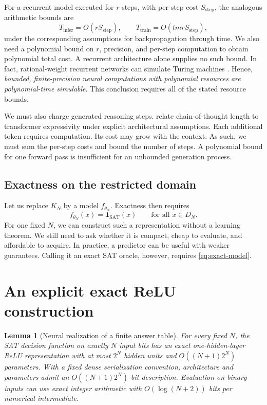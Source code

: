 \documentclass[11pt,a4paper]{article}
\numberwithin{equation}{section}
\newcommand{\SAT}{\mathrm{SAT}}
\newcommand{\ind}{\mathbf{1}}
\theoremstyle{plain}
\newtheorem{lemma}{Lemma}[section]
\theoremstyle{definition}
\theoremstyle{remark}
\begin{document}
For a recurrent model executed for $r$ steps, with per-step cost $S_{\mathrm{step}}$, the analogous arithmetic bounds are
\begin{equation}
T_{\mathrm{infer}}=O(rS_{\mathrm{step}}),\qquad
T_{\mathrm{train}}=O(tmrS_{\mathrm{step}}),
\end{equation}
under the corresponding assumptions for backpropagation through time. We also need a polynomial bound on $r$, precision, and per-step computation to obtain polynomial total cost. A recurrent architecture alone supplies no such bound. In fact, rational-weight recurrent networks can simulate Turing machines \citep{siegelmann1995}. Hence, \emph{bounded, finite-precision neural computations with polynomial resources are polynomial-time simulable}. This conclusion requires all of the stated resource bounds.

We must also charge generated reasoning steps. \citet{merrill2024cot} relate chain-of-thought length to transformer expressivity under explicit architectural assumptions. Each additional token requires computation. Its cost may grow with the context. As such, we must sum the per-step costs and bound the number of steps. A polynomial bound for one forward pass is insufficient for an unbounded generation process.

\subsection{Exactness on the restricted domain}

Let us replace $K_N$ by a model $f_{\theta_N}$. Exactness then requires
\begin{equation}
f_{\theta_N}(x)=\ind_{\SAT}(x)
\qquad\text{for all }x\in D_N.
\label{eq:exact-model}
\end{equation}
For one fixed $N$, we can construct such a representation without a learning theorem. We still need to ask whether it is compact, cheap to evaluate, and affordable to acquire. In practice, a predictor can be useful with weaker guarantees. Calling it an exact SAT oracle, however, requires \eqref{eq:exact-model}.

\section{An explicit exact ReLU construction}
\label{sec:relu}

\begin{lemma}[Neural realization of a finite answer table]
\label{lem:relu}
For every fixed $N$, the SAT decision function on exactly $N$ input bits has an exact one-hidden-layer ReLU representation with at most $2^N$ hidden units and $O((N+1)2^N)$ parameters. With a fixed dense serialization convention, architecture and parameters admit an $O((N+1)2^N)$-bit description. Evaluation on binary inputs can use exact integer arithmetic with $O(\log(N+2))$ bits per numerical intermediate.
\end{lemma}
\end{document}
